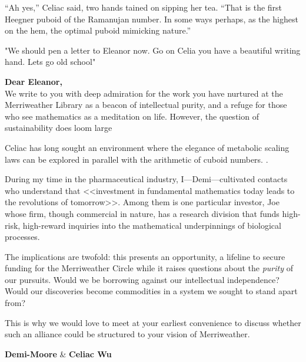 “Ah yes,” Celiac said, two hands tained on sipping her tea. “That is the first Heegner puboid of the Ramanujan number. In some ways perhaps, as the highest on the hem, the optimal puboid mimicking nature.”

"We should pen a letter to Eleanor now. Go on Celia you have a beautiful writing hand. Lets go old school"

{\calligra
\fontsize{13}{15}\selectfont
\begin{flushleft}
\textbf{Dear Eleanor,} \\

We write to you with deep admiration for the work you have nurtured at the Merriweather Library as a beacon of intellectual purity, and a refuge for those who see mathematics as a meditation on life. However, the question of sustainability does loom large

\smallskip

Celiac has long sought an environment where the elegance of metabolic scaling laws can be explored in parallel with the arithmetic of cuboid numbers. .

\smallskip

During my time in the pharmaceutical industry, I—Demi—cultivated contacts who understand that <<investment in fundamental mathematics today leads to the revolutions of tomorrow>>. Among them is one particular investor, Joe whose firm, though commercial in nature, has a research division that funds high-risk, high-reward inquiries into the mathematical underpinnings of biological processes. 

\smallskip

The implications are twofold: this presents an opportunity, a lifeline to secure funding for the Merriweather Circle while it raises questions about the \textit{purity} of our pursuits. Would we be borrowing against our intellectual independence? Would our discoveries become commodities in a system we sought to stand apart from? 


\smallskip

This is why we would love to meet at your earliest convenience to discuss whether such an alliance could be structured to your vision of Merriweather.

\bigskip

\textbf{Demi-Moore} \& \textbf{Celiac Wu} \\

\end{flushleft}
}

